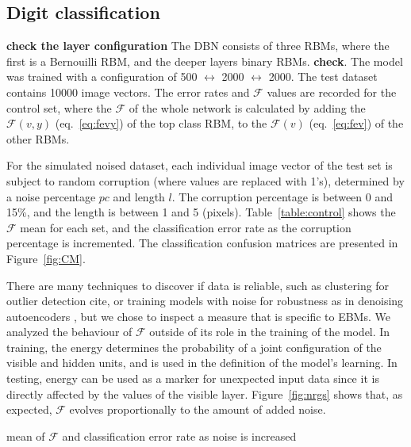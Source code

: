 \documentclass{report}
\begin{document}
\subsection{Digit classification}


\textbf{check the layer configuration}
The DBN consists of three RBMs, where the first is a Bernouilli RBM, and the deeper layers binary RBMs. \textbf{check}. The model was trained with a configuration of 500 $\leftrightarrow$ 2000 $\leftrightarrow$ 2000. The test dataset contains 10000 image vectors. The error rates and $\mathcal{F}$ values are recorded for the control set, where the $\mathcal{F}$ of the whole network is calculated by adding the $\mathcal{F}(v,y)$ (eq.~\eqref{eq:fevy}) of the top class RBM, to the $\mathcal{F}(v)$ (eq.~\eqref{eq:fev}) of the other RBMs.

For the simulated noised dataset, each individual image vector of the test set is subject to random corruption (where values are replaced with 1's), determined by a noise percentage $pc$ and length $l$. The corruption percentage is between 0 and 15\%, and the length is between 1 and 5 (pixels). Table~\ref{table:control} shows the $\mathcal{F}$ mean for each set, and the classification error rate as the corruption percentage is incremented. The classification confusion matrices are presented in Figure~\ref{fig:CM}.


There are many techniques to discover if data is reliable, such as clustering for outlier detection cite{}, or training models with noise for robustness as in denoising autoencoders \cite{Vincent}, but we chose to inspect a measure that is specific to EBMs. We analyzed the behaviour of $\mathcal{F}$ outside of its role in the training of the model. In training, the energy determines the probability of a joint configuration of the visible and hidden units, and is used in the definition of the model's learning. In testing, energy can be used as a marker for unexpected input data since it is directly affected by the values of the visible layer. Figure~\ref{fig:nrgs} shows that, as expected, $\mathcal{F}$ evolves proportionally to the amount of added noise. 

\begin{table}
	\begin{center}
	\end{center}
	\caption{mean of $\mathcal{F}$ and classification error rate as noise is increased}
	\label{table:control}
\end{table}
\end{document}
